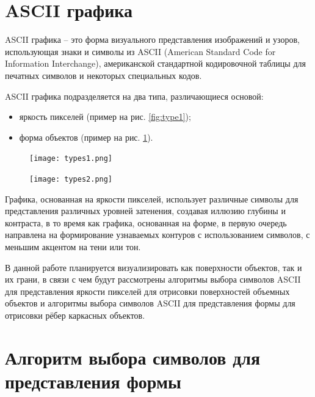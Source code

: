 \section{ASCII графика}

ASCII графика -- это форма визуального представления изображений и узоров, использующая знаки и символы из ASCII (American Standard Code for Information Interchange), американской стандартной кодировочной таблицы для печатных символов и некоторых специальных кодов.~\cite{ASCII-hist}

ASCII графика подразделяется на два типа, различающиеся основой:~\cite{Fast Text Placement Scheme for ASCII Art Synthesis}

\begin{itemize}
    \item яркость пикселей (пример на рис. \ref{fig:type1});
    \item форма объектов (пример на рис. \ref{fig:type2}).
\end{itemize}

\begin{figure}[H]
    \centering
    \begin{minipage}{0.45\textwidth}
        \centering
        \texttt{[image: types1.png]}
        \caption{}
	\label{fig:type1}
    \end{minipage}
    \begin{minipage}{0.40\textwidth}
        \centering
        \texttt{[image: types2.png]}
        \caption{}
	\label{fig:type2}
    \end{minipage}
\end{figure}

Графика, основанная на яркости пикселей, использует различные символы для представления различных уровней затенения, создавая иллюзию глубины и контраста, в то время как графика, основанная на форме, в первую очередь направлена на формирование узнаваемых контуров с использованием символов, с меньшим акцентом на тени или тон.

В данной работе планируется визуализировать как поверхности объектов, так и их грани, в связи с чем будут рассмотрены алгоритмы выбора символов ASCII для представления яркости пикселей для отрисовки поверхностей объемных объектов и алгоритмы выбора символов ASCII для представления формы для отрисовки рёбер каркасных объектов.

\section{Алгоритм выбора символов для представления формы}

